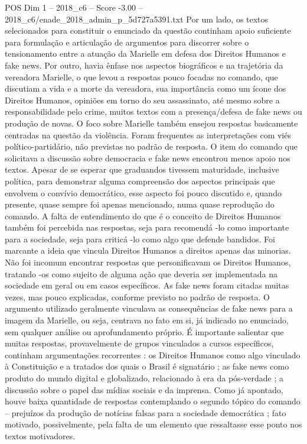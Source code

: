 \begin{textsample}{POS Dim 1 – 2018\_c6 – Score -3.00 – 2018\_c6/enade\_2018\_admin\_p\_5d727a5391.txt}
Por um lado, os textos selecionados para constituir o enunciado da questão continham apoio suficiente para formulação e articulação de argumentos para discorrer sobre o tensionamento entre a atuação da Marielle em defesa dos Direitos Humanos e fake news.
Por outro, havia ênfase nos aspectos biográficos e na trajetória da vereadora Marielle, o que levou a respostas pouco focadas no comando, que discutiam a vida e a morte da vereadora, sua importância como um ícone dos Direitos Humanos, opiniões em torno do seu assassinato, até mesmo sobre a responsabilidade pelo crime, muitos textos com a presença/defesa de fake news ou produção de novas.
O foco sobre Marielle também ensejou respostas basicamente centradas na questão da violência.
Foram frequentes as interpretações com viés político-partidário, não previstas no padrão de resposta.
O item do comando que solicitava a discussão sobre democracia e fake news encontrou menos apoio nos textos.
Apesar de se esperar que graduandos tivessem maturidade, inclusive política, para demonstrar alguma compreensão dos aspectos principais que envolvem o convívio democrático, esse aspecto foi pouco discutido e, quando presente, quase sempre foi apenas mencionado, numa quase reprodução do comando.
A falta de entendimento do que é o conceito de Direitos Humanos também foi percebida nas respostas, seja para recomendá -lo como importante para a sociedade, seja para criticá -lo como algo que defende bandidos.
Foi marcante a ideia que vincula Direitos Humanos a direitos apenas das minorias.
Não foi incomum encontrar respostas que personificavam os Direitos Humanos, tratando -os como sujeito de alguma ação que deveria ser implementada na sociedade em geral ou em casos específicos.
As fake news foram citadas muitas vezes, mas pouco explicadas, conforme previsto no padrão de resposta.
O argumento utilizado geralmente vinculava as consequências de fake news para a imagem da Marielle, ou seja, centrava no fato em si, já indicado no enunciado, sem qualquer análise ou aprofundamento próprio.
É importante salientar que muitas respostas, provavelmente de grupos vinculados a cursos específicos, continham argumentações recorrentes : os Direitos Humanos como algo vinculado à Constituição e a tratados dos quais o Brasil é signatário ; as fake news como produto do mundo digital e globalizado, relacionado à era da pós-verdade ; a discussão sobre o papel das mídias sociais e da imprensa.
Como já apontado, houve baixa quantidade de respostas contemplando o segundo tópico do comando – prejuízos da produção de notícias falsas para a sociedade democrática ; fato motivado, possivelmente, pela falta de um elemento que ressaltasse esse ponto nos textos motivadores.

\end{textsample}
